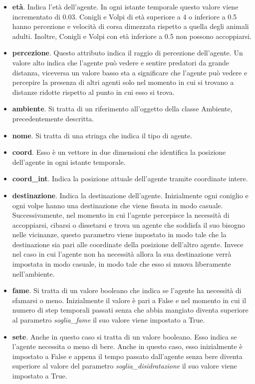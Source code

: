 \documentclass[11pt]{article}
\begin{document}
\begin{itemize}
    \item \textbf{età}. Indica l'età dell'agente. In ogni istante temporale questo valore viene incrementato di 0.03. Conigli e Volpi di età superiore a 4 o inferiore a 0.5 hanno percezione e velocità di corsa dimezzata rispetto a quella degli animali adulti. Inoltre, Conigli e Volpi con età inferiore a 0.5 non possono accoppiarsi. 
    \item \textbf{percezione}. Questo attributo indica il raggio di percezione dell'agente. Un valore alto indica che l'agente può vedere e sentire predatori da grande distanza, viceversa un valore basso sta a significare che l'agente può vedere e percepire la presenza di altri agenti solo nel momento in cui si trovano a distanze ridotte rispetto al punto in cui esso si trova. 
    \item \textbf{ambiente}. Si tratta di un riferimento all'oggetto della classe Ambiente, precedentemente descritta. 
    \item \textbf{nome}. Si tratta di una stringa che indica il tipo di agente. 
    \item \textbf{coord}. Esso è un vettore in due dimensioni che identifica la posizione dell'agente in ogni istante temporale. 
    \item \textbf{coord\_int}. Indica la posizione attuale dell'agente tramite coordinate intere.
    \item \textbf{destinazione}. Indica la destinazione dell'agente. Inizialmente ogni coniglio e ogni volpe hanno una destinazione che viene fissata in modo casuale. Successivamente, nel momento in cui l'agente percepisce la necessità di accoppiarsi, cibarsi o dissetarsi e trova un agente che soddisfa il suo bisogno nelle vicinanze, questo parametro viene impostato in modo tale che la destinazione sia pari alle coordinate della posizione dell'altro agente. 
    Invece nel caso in cui l'agente non ha necessità allora la sua destinazione verrà impostata in modo casuale, in modo tale che esso si muova liberamente nell'ambiente. 
    \item \textbf{fame}. Si tratta di un valore booleano che indica se l'agente ha necessità di sfamarsi o meno. Inizialmente il valore è pari a False e nel momento in cui il numero di step temporali passati senza che abbia mangiato diventa superiore al parametro \emph{soglia\_fame} il suo valore viene impostato a True. 
    \item \textbf{sete}. Anche in questo caso si tratta di un valore booleano. Esso indica se l'agente necessita o meno di bere. Anche in questo caso, esso inizialmente è impostato a False e appena il tempo passato dall'agente senza bere diventa superiore al valore del parametro \emph{soglia\_disidratazione} il suo valore viene impostato a True. 

\end{itemize}
\end{document}
